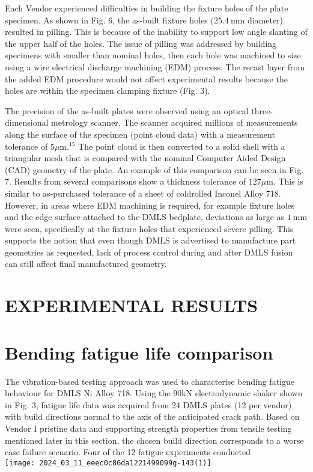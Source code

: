 \documentclass[10pt]{article}
\begin{document}
Each Vendor experienced difficulties in building the fixture holes of the plate specimen. As shown in Fig. 6, the as-built fixture holes $(25.4 \mathrm{~mm}$ diameter) resulted in pilling. This is because of the inability to support low angle slanting of the upper half of the holes. The issue of pilling was addressed by building specimens with smaller than nominal holes, then each hole was machined to size using a wire electrical discharge machining (EDM) process. The recast layer from the added EDM procedure would not affect experimental results because the holes are within the specimen clamping fixture (Fig. 3).

The precision of the as-built plates were observed using an optical three-dimensional metrology scanner. The scanner acquired millions of measurements along the surface of the specimen (point cloud data) with a measurement tolerance of $5 \mu \mathrm{m} .{ }^{15}$ The point cloud is then converted to a solid shell with a triangular mesh that is compared with the nominal Computer Aided Design (CAD) geometry of the plate. An example of this comparison can be seen in Fig. 7. Results from several comparisons show a thickness tolerance of $127 \mu \mathrm{m}$. This is similar to as-purchased tolerance of a sheet of coldrolled Inconel Alloy 718. However, in areas where EDM machining is required, for example fixture holes and the edge surface attached to the DMLS bedplate, deviations as large as $1 \mathrm{~mm}$ were seen, specifically at the fixture holes that experienced severe pilling. This supports the notion that even though DMLS is advertised to manufacture part geometries as requested, lack of process control during and after DMLS fusion can still affect final manufactured geometry.

\section*{EXPERIMENTAL RESULTS}
\section*{Bending fatigue life comparison}
The vibration-based testing approach was used to characterise bending fatigue behaviour for DMLS Ni Alloy 718. Using the $90 \mathrm{kN}$ electrodynamic shaker shown in Fig. 3, fatigue life data was acquired from 24 DMLS plates (12 per vendor) with build directions normal to the axis of the anticipated crack path. Based on Vendor I pristine data and supporting strength properties from tensile testing mentioned later in this section, the chosen build direction corresponds to a worse case failure scenario. Four of the 12 fatigue experiments conducted\\
\texttt{[image: 2024\_03\_11\_eeec0c86da1221499099g-143(1)]}
\end{document}
